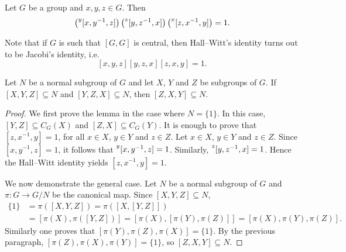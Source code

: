 \begin{lemma}
	\label{xca:HallWitt}
	Let $G$ be a group and $x,y,z\in G$. Then 
	\begin{equation}
		\label{eq:HallWitt}
	\left(\prescript{y}{}[x,y^{-1},z]\right)\left(\prescript{z}{}[y,z^{-1},x]\right)\left(\prescript{x}{}[z,x^{-1},y]\right)=1.
	\end{equation}
\end{lemma}

Note that if $G$ is such that $[G,G]$ is central, then Hall--Witt's identity 
turns out to be Jacobi's identity, i.e. 
\[ [x,y,z][y,z,x][z,x,y]=1.\]  

%

\begin{lemma}
	\label{lemma:3subgrupos_general}
	Let $N$ be a normal subgroup of $G$ and let $X$, $Y$ and $Z$
	be subgroups of $G$. If $[X,Y,Z]\subseteq N$ and $[Y,Z,X]\subseteq N$, then 
	$[Z,X,Y]\subseteq N$.
\end{lemma}

\begin{proof}
	We first prove the lemma in the case where $N=\{1\}$. 	In this case,  
	$[Y,Z]\subseteq C_G(X)$ and $[Z,X]\subseteq C_G(Y)$. It
	is enough to prove that $[z,x^{-1},y]=1$, for all $x\in X$, $y\in Y$ and $z\in Z$. 
	Let $x\in X$, $y\in Y$ and $z\in Z$. Since $[x,y^{-1},z]=1$, it follows that 
	$\prescript{y}{}[x,y^{-1},z]=1$.
	Similarly, $\prescript{z}{}[y,z^{-1},x]=1$. Hence the 
	Hall--Witt identity yields 
	$[z,x^{-1},y]=1$.

	We now demonstrate the general case. Let $N$ be a normal subgroup of $G$ 
	and $\pi\colon G\to G/N$ be the canonical map. Since $[X,Y,Z]\subseteq N$, 
	\begin{align*}
		\{1\}&=\pi([X,Y,Z])=\pi([ X,[Y,Z]])\\
		&=[\pi(X),\pi([Y,Z])]=[ \pi(X),[\pi(Y),\pi(Z)]]=[\pi(X),\pi(Y),\pi(Z)]. 
	\end{align*}
	Similarly one proves that $[\pi(Y),\pi(Z),\pi(X)]=\{1\}$. By the previous paragraph,  
	$[\pi(Z),\pi(X),\pi(Y)]=\{1\}$, so $[Z,X,Y]\subseteq N$.
\end{proof}

